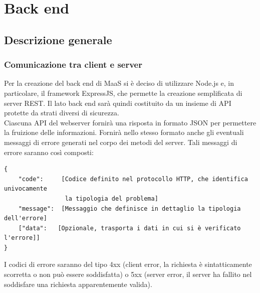 \section{Back end}
\subsection{Descrizione generale}
\subsubsection{Comunicazione tra client e server}
Per la creazione del back end di MaaS si è deciso di utilizzare Node.js e, in particolare, il framework ExpressJS, che permette la creazione semplificata di server REST. Il lato back end sarà quindi costituito da un insieme di API protette da strati diversi di sicurezza. \\
Ciascuna API del webserver fornirà una risposta in formato JSON per permettere la fruizione delle informazioni. Fornirà nello stesso formato anche gli eventuali messaggi di errore generati nel corpo dei metodi del server. Tali messaggi di errore saranno così composti: 
\begin{verbatim}
{
    "code":     [Codice definito nel protocollo HTTP, che identifica univocamente
                 la tipologia del problema]
    "message":  [Messaggio che definisce in dettaglio la tipologia dell'errore]
    ["data":   [Opzionale, trasporta i dati in cui si è verificato l'errore]]
}
\end{verbatim}
I codici di errore saranno del tipo 4xx (client error, la richiesta è sintatticamente scorretta o non può essere soddisfatta) o 5xx (server error, il server ha fallito nel soddisfare una richiesta apparentemente valida).

